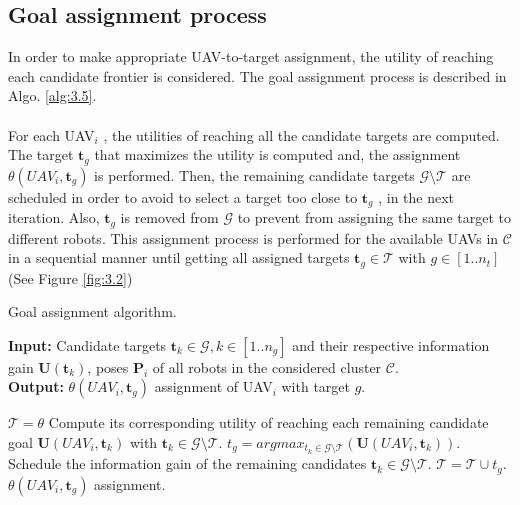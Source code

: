 \documentclass[11pt,openany]{book}
\begin{document}
\subsection{Goal assignment process}
In order to make appropriate UAV-to-target assignment, the utility of reaching each candidate frontier is considered. The goal assignment process is described in Algo. \ref{alg:3.5}.\\\\
For each UAV$_i$ , the utilities of reaching all the candidate targets are computed. The target $\mathbf{t}_g$ that maximizes the utility is computed and, the assignment $\theta(UAV_i,\mathbf{t}_g)$ is performed. Then, the remaining candidate targets $\mathcal{G}\setminus \mathcal{T}$ are scheduled in order to avoid to select a target too close to $\mathbf{t}_g$ , in the next iteration. Also, $\mathbf{t}_g$ is removed from $\mathcal{G}$ to prevent from assigning the same target to diﬀerent robots. This assignment process is performed for the available UAVs in $\mathcal{C}$ in a sequential manner until getting all assigned targets $\mathbf{t}_g \in \mathcal{T}$ with $g \in [1..n_t]$ (See Figure \ref{fig:3.2})
\begin{algorithm}[H]
    \caption{Goal assignment algorithm.}
    \label{alg:3.5}
    \hspace*{\algorithmicindent} \textbf{Input:} {Candidate targets $\mathbf{t}_k \in \mathcal{G}, k \in [1..n_g]$ and their respective information gain $\mathbf{U}(\mathbf{t}_k)$, poses $\mathbf{P}_i$ of all robots in the considered cluster $\mathcal{C}$.}\\
    \hspace*{\algorithmicindent} \textbf{Output:} {$\theta(UAV_i,\mathbf{t}_g)$ assignment of UAV$_i$ with target $g$.}
    \begin{algorithmic}[1]
        \STATE $\mathcal{T}=\theta$
        \STATE Compute its corresponding utility of reaching each remaining candidate goal $\mathbf{U}(UAV_i,\mathbf{t}_k)$ with $\mathbf{t}_k \in \mathcal{G}\setminus \mathcal{T}$.
        \STATE $t_g=argmax_{t_k \in \mathcal{G}\setminus \mathcal{T}}(\mathbf{U}(UAV_i,\mathbf{t}_k))$.
        \STATE Schedule the information gain of the remaining candidates $\mathbf{t}_k \in \mathcal{G} \setminus \mathcal{T}$.
        \STATE $\mathcal{T}=\mathcal{T}\cup t_g$.
        \ENDWHILE
        \RETURN $\theta(UAV_i, \mathbf{t}_g)$ assignment.
    \end{algorithmic}
\end{algorithm}
\end{document}
